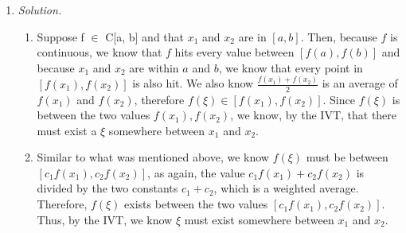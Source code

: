 \documentclass[12pt,letterpaper]{article}
\begin{document}
\begin{enumerate}
        \item \emph{Solution.} 
            \begin{enumerate}
                \item 
                Suppose f $\in$ C[a, b] and that $x_{1}$ and $x_{2}$ are in $[a, b]$. Then,
                because $f$ is continuous, we know that $f$ hits every value between $[f(a), f(b)]$
                and because $x_{1}$ and $x_{2}$ are within $a$ and $b$, we know that every point 
                in $[f(x_{1}), f(x_{2})]$ is also hit. We also know $\frac{f(x_{1}) + f(x_{2})}{2}$
                is an average of $f(x_{1})$ and $f(x_{2})$, therefore $f(\xi) \in [f(x_{1}), f(x_{2})]$.
                Since $f(\xi)$ is between the two values $f(x_{1}), f(x_{2})$, we know, by the IVT,
                that there must exist a $\xi$ somewhere between $x_{1}$ and $x_{2}$.
                
                \item
                Similar to what was mentioned above, we know $f(\xi)$ must be between 
                $[c_{1}f(x_{1}), c_{2}f(x_{2})]$, as again, the value $c_{1}f(x_{1}) + c_{2}f(x_{2})$
                is divided by the two constants $c_{1} + c_{2}$, which is a weighted average. Therefore, $f(\xi)$ exists between the two 
                values $[c_{1}f(x_{1}), c_{2}f(x_{2})]$. Thus, by the IVT, we know $\xi$ 
                must exist somewhere between $x_{1}$ and $x_{2}$.
            \end{enumerate}
            
            
    \end{enumerate}
\end{document}
